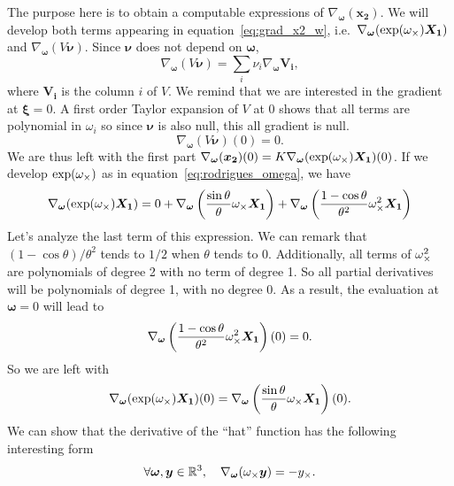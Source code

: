 The purpose here is to obtain a computable expressions of $\nabla_{\bm{\omega}}(\bm{x_2})$.
We will develop both terms appearing in equation~\ref{eq:grad_x2_w},
i.e.\ $\nabla_{\bm{\omega}} (\exp({\omega}_{\times}) \bm{X_1} )$
and $\nabla_{\bm{\omega}} (V \bm{\nu})$.
Since $\bm{\nu}$ does not depend on $\bm{\omega}$,
\begin{equation}
\label{eq:gradient_product_sum}
	\nabla_{\bm{\omega}} (V \bm{\nu})
	= \sum_i \nu_i \nabla_{\bm{\omega}}\bm{V_i},
\end{equation}
where $\bm{V_i}$ is the column $i$ of $V$.
We remind that we are interested in the gradient at $\bm{\xi} = 0$.
A first order Taylor expansion of $V$ at 0 shows that all terms are polynomial
in $\omega_i$ so since $\bm{\nu}$ is also null, this all gradient is null.
\begin{equation}
\label{eq:grad_V_omega}
	\nabla_{\bm{\omega}} (V \bm{\nu})(0) = 0.
\end{equation}
We are thus left with the first part
$\nabla_{\bm{\omega}}(\bm{x_2})(0) = K \nabla_{\bm{\omega}} (\exp({\omega}_{\times}) \bm{X_1} )(0)$.
If we develop $\exp({\omega}_{\times})$ as in equation~\ref{eq:rodrigues_omega},
we have
\[
	\nabla_{\bm{\omega}} (\exp({\omega}_{\times}) \bm{X_1} )
	= 0
	+ \nabla_{\bm{\omega}} \left( \frac{\sin\theta}{\theta} {\omega}_{\times} \bm{X_1} \right)
	+ \nabla_{\bm{\omega}} \left( \frac{1-\cos\theta}{\theta^2} {\omega}_{\times}^2 \bm{X_1} \right)
\]
Let's analyze the last term of this expression.
We can remark that $(1-\cos\theta)/\theta^2$ tends to $1/2$ when $\theta$ tends to 0.
Additionally, all terms of ${\omega}_{\times}^2$
are polynomials of degree 2 with no term of degree 1.
So all partial derivatives will be polynomials of degree 1, with no degree 0.
As a result, the evaluation at $\bm{\omega} = 0$ will lead to
\begin{equation}
\label{eq:second_order_null}
	\nabla_{\bm{\omega}} \left( \frac{1-\cos\theta}{\theta^2} {\omega}_{\times}^2 \bm{X_1} \right)(0) = 0.
\end{equation}
So we are left with
\begin{equation}
\label{eq:grad_exp_omega}
	\nabla_{\bm{\omega}} (\exp({\omega}_{\times}) \bm{X_1} )(0)
	= \nabla_{\bm{\omega}} \left( \frac{\sin\theta}{\theta} {\omega}_{\times} \bm{X_1} \right)(0).
\end{equation}
We can show that the derivative of the ``hat'' function has the following interesting form
\begin{equation}
\label{eq:gradient_cross_product}
	\forall \bm{\omega}, \bm{y} \in \mathbb{R}^3,\quad \nabla_{\bm{\omega}} ({\omega}_{\times} \bm{y}) = - y_{\times}.
\end{equation}
